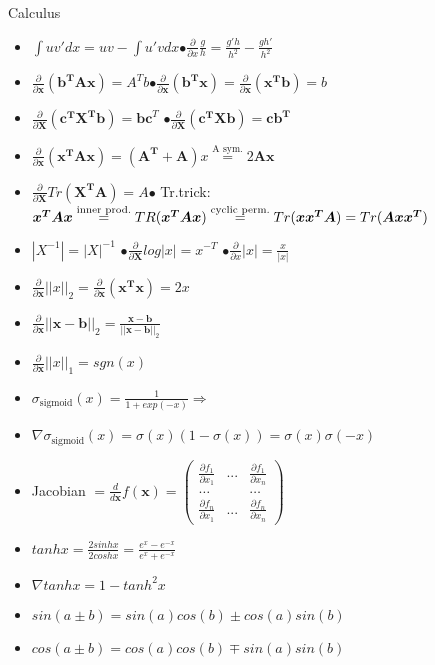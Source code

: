 Calculus
\begin{itemize}
    \item $\int uv'dx = uv - \int u'vdx$\hspace{0.3cm}$ \bullet\frac{\partial}{\partial x}\frac{g}{h} = \frac{g'h}{h^2} - \frac{gh'}{h^2}$
    \item $\frac{\partial}{\partial\boldsymbol{ x}}(\boldsymbol{b^TAx})=A^Tb$\hspace{0.3cm}$\bullet \frac{\partial}{\partial\boldsymbol{ x}}(\boldsymbol{b^Tx}) = \frac{\partial}{\partial\boldsymbol{ x}}(\boldsymbol{x^Tb}) = b$
    \item $\frac{\partial}{\partial\boldsymbol{ X}}(\boldsymbol{c^TX^Tb}) = \boldsymbol{bc}^T$ \hspace{0.3cm} $\bullet\frac{\partial}{\partial\boldsymbol{ X}}(\boldsymbol{c^TXb}) = \boldsymbol{cb^T}$
    \item $\frac{\partial}{\partial\boldsymbol{ x}}(\boldsymbol{x^TAx})=(\boldsymbol{A^T +A})x \overset{\text{A sym.}}{=} 2\boldsymbol{Ax}$
    \item $\frac{\partial}{\partial\boldsymbol{ X}}Tr(\boldsymbol{X^TA}) = A$\hspace{0.3cm}$\bullet$ Tr.trick: $\boldsymbol{x^TAx} \overset{\text{inner prod.}}{=}\\
    TR(\boldsymbol{x^TAx}) \overset{\text{cyclic perm.}}{=} Tr(\boldsymbol{xx^TA}) = Tr(\boldsymbol{Axx^T})$
    \item $|X^{-1}|=|X|^{-1}$ \hspace{0.02cm} $\bullet \frac{\partial}{\partial\boldsymbol{ X}}log|x|=x^{-T}$ \hspace{0.02cm} $\bullet \frac{\partial}{\partial x}|x| = \frac{x}{|x|}$
    \item $\frac{\partial}{\partial\boldsymbol{ x}}||x||_2 = \frac{\partial}{\partial\boldsymbol{ x}}(\boldsymbol{x^Tx}) = 2x$
    \item $\frac{\partial}{\partial\boldsymbol{ x}}||\boldsymbol{x-b}||_2 = \frac{\boldsymbol{x-b}}{||\boldsymbol{x-b}||_2}$
    \item $\frac{\partial}{\partial\boldsymbol{ x}} ||x||_1 = sgn(x)$
    \item $\sigma_{\text{sigmoid}}(x) = \frac{1}{1 + exp(-x)} \Rightarrow $
    \item $\nabla \sigma_{\text{sigmoid}}(x) = \sigma(x)(1-\sigma(x)) = \sigma(x)\sigma(-x)$
    \item Jacobian $= \frac{d}{d\boldsymbol{x}}f(\boldsymbol{x}) = \begin{pmatrix}
        \frac{\partial f_1}{\partial x_1} & ... & \frac{\partial f_1}{\partial x_n}\\
        \dots & & \dots\\
        \frac{\partial f_n}{\partial x_1} & ... & \frac{\partial f_n}{\partial x_n}
    \end{pmatrix}$
    \item $tanhx = \frac{2sinhx}{2coshx} = \frac{e^x - e^{-x}}{e^x + e^{-x}}$
    \item $\nabla tanhx = 1 - tanh^2x$
    \item $sin(a\pm b) = sin(a)cos(b) \pm cos(a)sin(b)$
    \item $cos(a\pm b) = cos(a)cos(b) \mp sin(a)sin(b)$
\end{itemize}